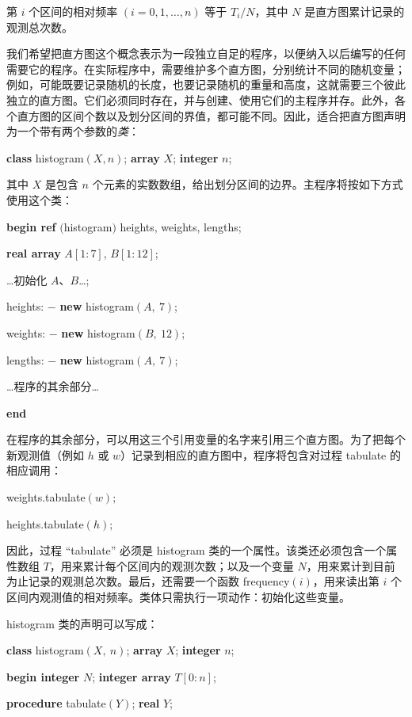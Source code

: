 \noindent
第 $i$ 个区间的相对频率 $(i = 0, 1, \dots, n)$ 等于 $T_i / N$，其中 $N$ 是直方图累计记录的观测总次数。

我们希望把直方图这个概念表示为一段独立自足的程序，以便纳入以后编写的任何需要它的程序。在实际程序中，需要维护多个直方图，分别统计不同的随机变量；例如，可能既要记录随机的长度，也要记录随机的重量和高度，这就需要三个彼此独立的直方图。它们必须同时存在，并与创建、使用它们的主程序并存。此外，各个直方图的区间个数以及划分区间的界值，都可能不同。因此，适合把直方图声明为一个带有两个参数的\textit{类}：

\quad \textbf{class} histogram$(X, n)$; \textbf{array} $X$; \textbf{integer} $n$;

\noindent
其中 $X$ 是包含 $n$ 个元素的实数数组，给出划分区间的边界。主程序将按如下方式使用这个类：

\quad \textbf{begin ref} $($histogram$)$ heights, weights, lengths;

\quad \quad \textbf{real array} $A[1:7]$, $B[1:12]$;

\quad \quad \dots 初始化 $A$、$B$\dots;

\quad \quad heights: $-$ \textbf{new} histogram$(A,\ 7)$;

\quad \quad weights: $-$ \textbf{new} histogram$(B,\ 12)$;

\quad \quad lengths: $-$ \textbf{new} histogram$(A,\ 7)$;

\quad \quad \dots 程序的其余部分\dots

\quad \textbf{end}

在程序的其余部分，可以用这三个引用变量的名字来引用三个直方图。为了把每个新观测值（例如 $h$ 或 $w$）记录到相应的直方图中，程序将包含对过程 tabulate 的相应调用：

\quad weights.tabulate$(w);$

\quad heights.tabulate$(h);$

\noindent
因此，过程 ``tabulate'' 必须是 histogram 类的一个属性。该类还必须包含一个属性数组 $T$，用来累计每个区间内的观测次数；以及一个变量 $N$，用来累计到目前为止记录的观测总次数。最后，还需要一个函数 frequency$(i)$，用来读出第 $i$ 个区间内观测值的相对频率。类体只需执行一项动作：初始化这些变量。

histogram 类的声明可以写成：

\quad \textbf{class} histogram$(X,\ n)$; \textbf{array} $X$; \textbf{integer} $n$;

\quad \quad \textbf{begin integer} $N$; \textbf{integer array} $T[0:n]$;

\quad \quad \quad \textbf{procedure} tabulate$(Y)$; \textbf{real} $Y$;

